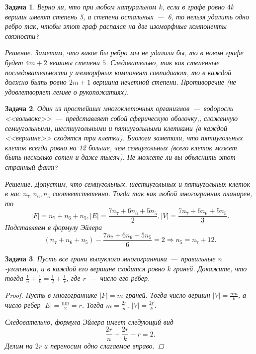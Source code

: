 \documentclass[12pt,a4paper,fleqn]{article}
\newtheorem{exersize}{Задача}
\begin{document}
\begin{exersize}
	Верно ли, что при любом натуральном $k$, если в графе ровно $4k$ вершин имеют степень 5, а степени остальных~---~6, то нельзя удалить одно ребро так, чтобы этот граф распался на две изоморфные компоненты связности?
	
	\emph{Решение.} Заметим, что какое бы ребро мы не удалили бы, то в новом графе будет $4m+2$ вешины степени $5$. Следовательно, так как степенные последовательности у изоморфных компонент совпадаают, то в каждой должно быть ровно $2m+1$ вершина нечетной степени. Противоречие (не удовлетворяет лемме о рукопожатиях).
\end{exersize}


\begin{exersize}
	Один из простейших многоклеточных организмов~---~водоросль <<вольвокс>>~---~представляет собой сферическую оболочку,, сложенную семиугольными, шестиугольными и пятиугольными клетками (в каждой <<вершине>> сходятся три клетки). Биологи заметили, что пятиугольных клеток всегда ровно на 12 больше, чем семиугольных (всего клеток может быть несколько сотен и даже тысяч). Не можете ли вы объяснить этот странный факт?
	
	\emph{Решение.} Допустим, что семиугольных, шестиугольных и пятиугольных клеток в нас $n_7, n_6, n_5$ соответствтенно. Тогда так как любой многогранник планирен, то 
	$$|F| = n_7 + n_6 + n_5, |E| = \frac{7n_7 + 6n_6 + 5n_5}{2}, |V| = \frac{7n_7 + 6n_6 + 5n_5}{3}.$$
	Подставляем в формулу Эйлера
	$$(n_7 + n_6 + n_5) - \frac{7n_7 + 6n_6 + 5n_5}{6} = 2 \Rightarrow n_5 = n_7 + 12.$$
\end{exersize}

\begin{exersize}
	Пусть все грани выпуклого многогранника~---~правильные $n$-угольники, и в каждой его вершине сходится ровно $k$ граней. Докажите, что тогда $\frac{1}{n} + \frac{1}{k} = \frac{1}{2} + \frac{1}{r}$, где $r$~---~число его рёбер.
	
\begin{proof}
	Пусть в многограннике $|F| = m$ граней. Тогда число вершин $|V| = \frac{nm}{k}$, а число ребер $|E| = \frac{nm}{2} = r$. Тогда $m = \frac{2r}{n}$, $|V| = \frac{2r}{k}$.
	
	Следовательно, формула Эйлера имеет следующий вид
	$$\frac{2r}{n} + \frac{2r}{k} - r = 2.$$
	Делим на $2r$ и переносим одно слагаемое вправо.
\end{proof}
\end{exersize}
\end{document}
